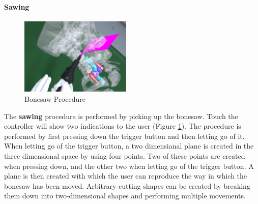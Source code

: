 \paragraph{Sawing}

\begin{figure}[ht]
    \centering
    \includegraphics[width=200px]{images/implementation/features/procedures/bonesaw.png}
    \caption{\label{fig::FeatureBoneSaw}Bonesaw Procedure}
\end{figure}

The \textbf{sawing} procedure is performed by picking up the bonesaw.
Touch the controller will show two indications to the user (Figure \ref{fig::FeatureBoneSaw}).
The procedure is performed by first pressing down the trigger button and then letting go of it.
When letting go of the trigger button, a two dimensianal plane is created in the three dimensional space by using four points.
Two of these points are created when pressing down, and the other two when letting go of the trigger button.
A plane is then created with which the user can reproduce the way in which the bonesaw has been moved.
Arbitrary cutting shapes can be created by breaking them down into two-dimensional shapes and performing multiple movements.